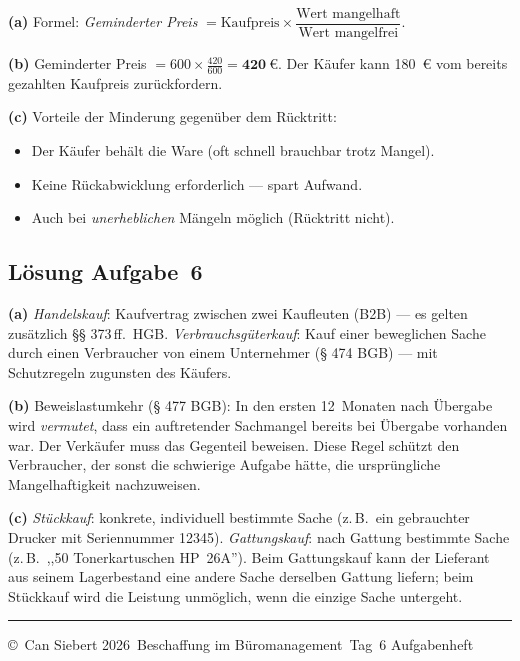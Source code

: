 \documentclass[11pt, a4paper]{article}
\begin{document}
\begin{loesung}
\textbf{(a)} Formel: \emph{Geminderter Preis} $= \text{Kaufpreis} \times \dfrac{\text{Wert mangelhaft}}{\text{Wert mangelfrei}}$.

\textbf{(b)} Geminderter Preis $= 600 \times \frac{420}{600} = \mathbf{420~€}$.
Der Käufer kann 180~€ vom bereits gezahlten Kaufpreis zurückfordern.

\textbf{(c)} Vorteile der Minderung gegenüber dem Rücktritt:
\begin{itemize}[itemsep=0pt]
  \item Der Käufer behält die Ware (oft schnell brauchbar trotz Mangel).
  \item Keine Rückabwicklung erforderlich --- spart Aufwand.
  \item Auch bei \emph{unerheblichen} Mängeln möglich (Rücktritt nicht).
\end{itemize}
\end{loesung}

\subsection*{Lösung Aufgabe~6}

\begin{loesung}
\textbf{(a)} \emph{Handelskauf}: Kaufvertrag zwischen zwei Kaufleuten (B2B) --- es gelten
zusätzlich §§ 373\,ff.\ HGB. \emph{Verbrauchsgüterkauf}: Kauf einer beweglichen Sache
durch einen Verbraucher von einem Unternehmer (§ 474 BGB) --- mit Schutzregeln zugunsten
des Käufers.

\textbf{(b)} Beweislastumkehr (§ 477 BGB): In den ersten 12~Monaten nach Übergabe wird
\emph{vermutet}, dass ein auftretender Sachmangel bereits bei Übergabe vorhanden war.
Der Verkäufer muss das Gegenteil beweisen. Diese Regel schützt den Verbraucher, der
sonst die schwierige Aufgabe hätte, die ursprüngliche Mangelhaftigkeit nachzuweisen.

\textbf{(c)} \emph{Stückkauf}: konkrete, individuell bestimmte Sache (z.\,B.\ ein
gebrauchter Drucker mit Seriennummer 12345). \emph{Gattungskauf}: nach Gattung bestimmte
Sache (z.\,B.\ ,,50 Tonerkartuschen HP~26A''). Beim Gattungskauf kann der Lieferant
aus seinem Lagerbestand eine andere Sache derselben Gattung liefern; beim Stückkauf
wird die Leistung unmöglich, wenn die einzige Sache untergeht.
\end{loesung}

\vfill
\hrule
\vspace{0.5em}
\noindent\small\color{bfwInkSoft}\copyright\ Can Siebert\,\textperiodcentered\,2026\,\textperiodcentered{} Beschaffung im Büromanagement\,\textperiodcentered{} Tag~6 Aufgabenheft
\end{document}
